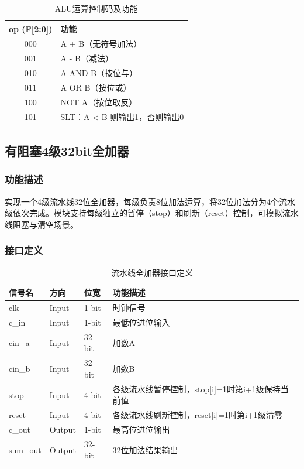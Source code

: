 \begin{table}[htp]
\caption{ALU运算控制码及功能}\label{tab:aluop}
\begin{center}
	\begin{tabular}{|c|l|}
	\hline
	\textbf{op (F[2:0])} & \textbf{功能} \\ \hline \hline
	000 & A + B（无符号加法）\\ \hline
	001 & A - B（减法）\\ \hline
	010 & A AND B（按位与）\\ \hline
	011 & A OR B（按位或）\\ \hline
	100 & NOT A（按位取反）\\ \hline
	101 & SLT：A < B 则输出1，否则输出0 \\ \hline
	\end{tabular}
\end{center}
\end{table}

\subsection{有阻塞4级32bit全加器}\label{sub:ctl}

\subsubsection{功能描述}
实现一个4级流水线32位全加器，每级负责8位加法运算，将32位加法分为4个流水级依次完成。模块支持每级独立的暂停（stop）和刷新（reset）控制，可模拟流水线阻塞与清空场景。

\subsubsection{接口定义}

\begin{table}[htp]
\caption{流水线全加器接口定义}\label{tab:pipelinedef}
\begin{center}
	\begin{tabular}{|l|l|l|p{6cm}|}
	\hline
	\textbf{信号名} & \textbf{方向} & \textbf{位宽} & \textbf{功能描述}\\ \hline \hline
	clk      & Input  & 1-bit  & 时钟信号 \\ \hline
	c\_in    & Input  & 1-bit  & 最低位进位输入 \\ \hline
	cin\_a   & Input  & 32-bit & 加数A \\ \hline
	cin\_b   & Input  & 32-bit & 加数B \\ \hline
	stop     & Input  & 4-bit  & 各级流水线暂停控制，stop[i]=1时第i+1级保持当前值 \\ \hline
	reset    & Input  & 4-bit  & 各级流水线刷新控制，reset[i]=1时第i+1级清零 \\ \hline
	c\_out   & Output & 1-bit  & 最高位进位输出 \\ \hline
	sum\_out & Output & 32-bit & 32位加法结果输出 \\ \hline
	\end{tabular}
\end{center}
\end{table}

